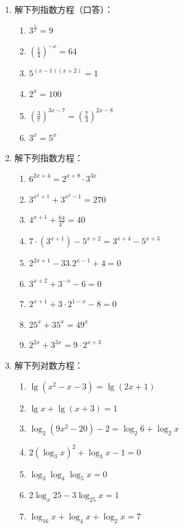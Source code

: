 \begin{enumerate}
    \item 解下列指数方程（口答）：
\begin{multicols}{2}
\begin{enumerate}[(1)]
    \item $3^{\tfrac{1}{x}}=9$
    \item $\left(\frac{1}{4}\right)^{-x}=64$
    \item $5^{(x-1)(x+2)}=1$
    \item $2^x=100$
    \item $\left(\frac{3}{7}\right)^{3x-7}=\left(\frac{7}{3}\right)^{2x-8}$
    \item $3^x=5^x$
\end{enumerate}
\end{multicols}

\item 解下列指数方程：
\begin{multicols}{2}
\begin{enumerate}[(1)]
    \item $6^{2x+4}=2^{x+8}\cdot 3^{3x}$
    \item $3^{x^2+1}+3^{x^2-1}=270$
    \item $4^{x+1}+\frac{64}{4^x}=40$
    \item $7\cdot (3^{x+1})-5^{x+2}=3^{x+4}-5^{x+3}$
    \item $2^{2x+1}-33.2^{x-1}+4=0$
    \item $3^{x+2}+3^{-x}-6=0$
    \item $2^{x+1}+3\cdot 2^{1-x}-8=0$
    \item $25^x +35^x=49^x$
    \item $2^{2x}+3^{3x}=9\cdot 2^{x+3}$
\end{enumerate}
\end{multicols}

\item 解下列对数方程：
\begin{multicols}{2}
\begin{enumerate}[(1)]
    \item $\lg(x^2-x-3)=\lg(2x+1)$
    \item $\lg x+\lg(x+3)=1$
    \item $\log_2 (9x^2-20)-2=\log_2 6+\log_2 x$
    \item $2(\log_3 x)^2+\log_3 x-1=0$
    \item $\log_3 \log_4\log_5 x=0$
    \item $2\log_x 25-3\log_{25}x=1$
    \item $\log_{16}x+\log_4 x+\log_2 x=7$
\end{enumerate}
\end{multicols}
\end{enumerate}

